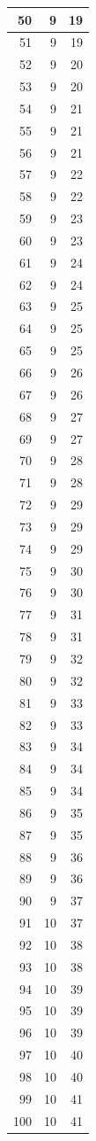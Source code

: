 \documentclass[
]{book}
\begin{document}
\begin{tabular}{r|r|r}
\hline
50 & 9 & 19\\
\hline
51 & 9 & 19\\
\hline
52 & 9 & 20\\
\hline
53 & 9 & 20\\
\hline
54 & 9 & 21\\
\hline
55 & 9 & 21\\
\hline
56 & 9 & 21\\
\hline
57 & 9 & 22\\
\hline
58 & 9 & 22\\
\hline
59 & 9 & 23\\
\hline
60 & 9 & 23\\
\hline
61 & 9 & 24\\
\hline
62 & 9 & 24\\
\hline
63 & 9 & 25\\
\hline
64 & 9 & 25\\
\hline
65 & 9 & 25\\
\hline
66 & 9 & 26\\
\hline
67 & 9 & 26\\
\hline
68 & 9 & 27\\
\hline
69 & 9 & 27\\
\hline
70 & 9 & 28\\
\hline
71 & 9 & 28\\
\hline
72 & 9 & 29\\
\hline
73 & 9 & 29\\
\hline
74 & 9 & 29\\
\hline
75 & 9 & 30\\
\hline
76 & 9 & 30\\
\hline
77 & 9 & 31\\
\hline
78 & 9 & 31\\
\hline
79 & 9 & 32\\
\hline
80 & 9 & 32\\
\hline
81 & 9 & 33\\
\hline
82 & 9 & 33\\
\hline
83 & 9 & 34\\
\hline
84 & 9 & 34\\
\hline
85 & 9 & 34\\
\hline
86 & 9 & 35\\
\hline
87 & 9 & 35\\
\hline
88 & 9 & 36\\
\hline
89 & 9 & 36\\
\hline
90 & 9 & 37\\
\hline
91 & 10 & 37\\
\hline
92 & 10 & 38\\
\hline
93 & 10 & 38\\
\hline
94 & 10 & 39\\
\hline
95 & 10 & 39\\
\hline
96 & 10 & 39\\
\hline
97 & 10 & 40\\
\hline
98 & 10 & 40\\
\hline
99 & 10 & 41\\
\hline
100 & 10 & 41\\
\hline
\end{tabular}
\end{document}
